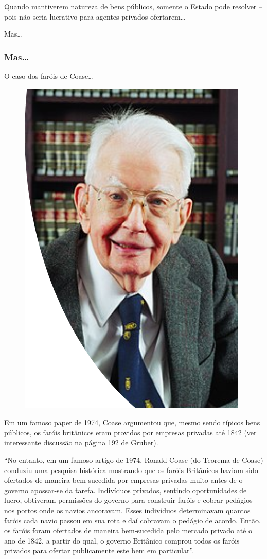 \documentclass[a4paper,12pt]{article}[abntex2]
\begin{document}
Quando mantiverem natureza de bens públicos, somente o Estado pode resolver – pois não seria lucrativo para agentes privados ofertarem…

Mas…  

\subsubsection{\textbf{Mas…}}
O caso dos faróis de Coase…

\begin{figure}[H]
    \centering
    \includegraphics[width=0.5\linewidth]{Imagens/a14i1.png}
\end{figure}

Em um famoso paper de 1974, Coase argumentou que, mesmo sendo típicos bens públicos, os faróis britânicos eram providos por empresas privadas  até 1842 (ver interessante discussão na página 192 de Gruber).

“No entanto, em  um famoso artigo de 1974, Ronald Coase (do Teorema de Coase) conduziu uma pesquisa histórica mostrando que os faróis Britânicos haviam sido ofertados de maneira bem-sucedida por empresas privadas muito antes de o governo apossar-se da tarefa. Indivíduos privados, sentindo oportunidades de lucro, obtiveram permissões do governo para construir faróis e cobrar pedágios nos portos onde os navios ancoravam. Esses indivíduos determinavam quantos faróis cada navio passou em sua rota e daí cobravam o pedágio de acordo. Então, os faróis foram ofertados de maneira bem-sucedida pelo mercado privado até o ano de 1842, a partir do qual, o governo Britânico comprou todos os faróis privados para ofertar publicamente este bem em particular”.
\end{document}
